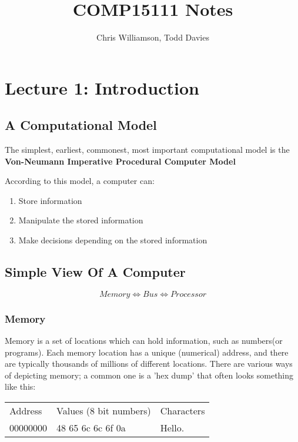 \documentclass{article}
\begin{document}
\author{Chris Williamson, Todd Davies}
\title{COMP15111 Notes}

\maketitle
\tableofcontents
\newpage

\section{Lecture 1: Introduction}
\subsection{A Computational Model}
The simplest, earliest, commonest, most important computational model is the \textbf{Von-Neumann Imperative Procedural Computer Model}

According to this model, a computer can:
\begin{enumerate}
	\item Store information
	\item Manipulate the stored information
	\item Make decisions depending on the stored information
\end{enumerate}

\subsection{Simple View Of A Computer}
\[
	Memory \Leftrightarrow Bus \Leftrightarrow Processor
\]

\subsubsection{Memory}
Memory is a set of locations which can hold information, such as numbers(or programs). Each memory location has a unique (numerical) address, and there are typically thousands of millions of different locations. There are various ways of depicting memory; a common one is a 'hex dump' that often looks something like this: 

\begin{tabular}{l l l}
	Address     &	Values (8 bit numbers)	&	Characters\\
	00000000	&	48 65 6c 6c 6f 0a		&	Hello.\\
\end{tabular}
\end{document}
